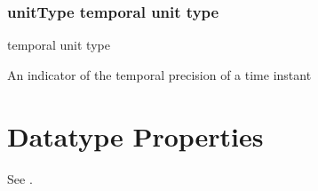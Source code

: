 \documentclass[letterpaper,10pt,english]{sphinxmanual}
\begin{document}
\subsection{unitType \sphinxhyphen{} temporal unit type}
\label{\detokenize{doc-unitType:unittype-temporal-unit-type}}\label{\detokenize{doc-unitType:index-0}}\label{\detokenize{doc-unitType::doc}}
\begin{sphinxShadowBox}

\sphinxAtStartPar
temporal unit type
\end{sphinxShadowBox}

\begin{sphinxShadowBox}

\sphinxAtStartPar
An indicator of the temporal precision of a time instant
\end{sphinxShadowBox}

\begin{sphinxShadowBox}

\sphinxAtStartPar
{}
\end{sphinxShadowBox}


\chapter{Datatype Properties}
\label{\detokenize{datatype-properties:datatype-properties}}\label{\detokenize{datatype-properties::doc}}
\sphinxAtStartPar
See {\hyperref[\detokenize{datatype-properties:table-8}]{}}.
\end{document}
